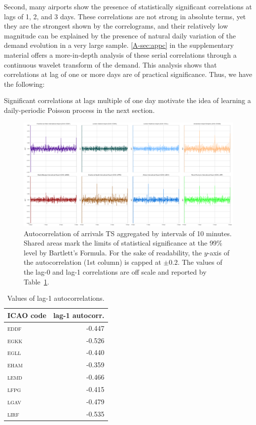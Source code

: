 \documentclass[]{elsarticle}
\newcommand{\airp}[1]{\textcolor{#1}{\textsc{#1}}}
\begin{document}
Second, many airports show the presence of statistically significant correlations at lags of 1, 2, and 3 days.
These correlations are not strong in absolute terms, yet they are the strongest shown by the correlograms, and their relatively low magnitude can be explained by the presence of natural daily variation of the demand evolution in a very large sample.
\ref{A-sec:appc} in the supplementary material offers a more-in-depth analysis of these serial correlations through a continuous wavelet transform of the demand. This analysis shows that correlations at lag of one or more days are of practical significance. Thus, we have the following:
\begin{kpt}\label{rmk:correlations}
  Significant correlations at lags multiple of one day motivate the idea of learning a daily-periodic Poisson process in the next section.
\end{kpt}

\begin{figure}
  \includegraphics[width=\textwidth]{Autocorr}
  \caption{Autocorrelation of arrivals \ac{TS} aggregated by intervals of 10 minutes. Shared areas mark the limits of statistical significance at the 99\% level by Bartlett's Formula. For the sake of readability, the \(y\)-axis of the autocorrelation (1st column) is capped at \(\pm 0.2\). The values of the lag-0 and lag-1 correlations are off scale and reported by Table~\ref{tab:lag01}.}\label{fig:autocorr}
\end{figure}

\begin{table}[tbp]
  \centering
  \caption{Values of lag-1 autocorrelations.}\label{tab:lag01}
  \begin{tabular}{lr}
    \toprule
    \acs{ICAO} code & lag-1 autocorr.\\
    \midrule
    \airp{eddf} & -0.447\\
    \airp{egkk} & -0.526\\
    \airp{egll} & -0.440\\
    \airp{eham} & -0.359\\
    \airp{lemd} & -0.466\\
    \airp{lfpg} & -0.415\\
    \airp{lgav} & -0.479\\
    \airp{lirf} & -0.535\\
    \bottomrule
  \end{tabular}
\end{table}
\end{document}
